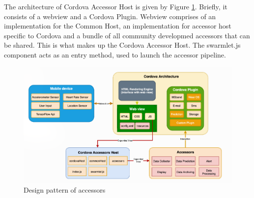The architecture of Cordova Accessor Host is given by Figure \ref{fig:cordova}. Briefly, it consists of a webview and 
a Cordova Plugin. Webview comprises of an implementation for the Common Host, an implementation for accessor host 
specific to Cordova and a bundle of all community developmed accessors that can be shared. This is what makes up the 
Cordova Accessor Host. The swarmlet.js component acts as an entry method, used to launch the accessor pipeline.

\begin{figure}
    \begin{center}
        \includegraphics[scale=0.35]{Figs/cordova.png}    
    \end{center}
    \caption{Design pattern of accessors \cite{9446337}}
    \label{fig:cordova}
\end{figure}